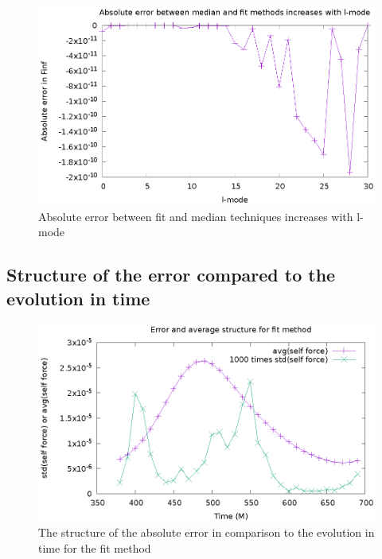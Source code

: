 \documentclass{article}
\begin{document}
\begin{figure}
  \includegraphics{absErrorIncreaseslmode}
  \caption{Absolute error between fit and median techniques increases with l-mode}
\end{figure}

\subsection{Structure of the error compared to the evolution in time}
\begin{figure}
  \includegraphics{structErrFitMethod}
  \caption{The structure of the absolute error in comparison to the evolution in time for the fit method}
\end{figure}
\end{document}
